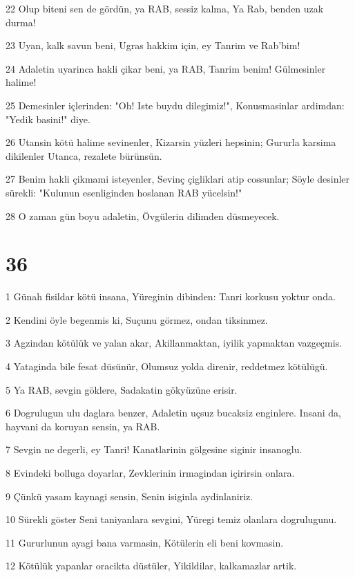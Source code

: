 \par 22 Olup biteni sen de gördün, ya RAB, sessiz kalma, Ya Rab, benden uzak durma!
\par 23 Uyan, kalk savun beni, Ugras hakkim için, ey Tanrim ve Rab'bim!
\par 24 Adaletin uyarinca hakli çikar beni, ya RAB, Tanrim benim! Gülmesinler halime!
\par 25 Demesinler içlerinden: "Oh! Iste buydu dilegimiz!", Konusmasinlar ardimdan: "Yedik basini!" diye.
\par 26 Utansin kötü halime sevinenler, Kizarsin yüzleri hepsinin; Gururla karsima dikilenler Utanca, rezalete bürünsün.
\par 27 Benim hakli çikmami isteyenler, Sevinç çigliklari atip cossunlar; Söyle desinler sürekli: "Kulunun esenliginden hoslanan RAB yücelsin!"
\par 28 O zaman gün boyu adaletin, Övgülerin dilimden düsmeyecek.

\chapter{36}

\par 1 Günah fisildar kötü insana, Yüreginin dibinden: Tanri korkusu yoktur onda.
\par 2 Kendini öyle begenmis ki, Suçunu görmez, ondan tiksinmez.
\par 3 Agzindan kötülük ve yalan akar, Akillanmaktan, iyilik yapmaktan vazgeçmis.
\par 4 Yataginda bile fesat düsünür, Olumsuz yolda direnir, reddetmez kötülügü.
\par 5 Ya RAB, sevgin göklere, Sadakatin gökyüzüne erisir.
\par 6 Dogrulugun ulu daglara benzer, Adaletin uçsuz bucaksiz enginlere. Insani da, hayvani da koruyan sensin, ya RAB.
\par 7 Sevgin ne degerli, ey Tanri! Kanatlarinin gölgesine siginir insanoglu.
\par 8 Evindeki bolluga doyarlar, Zevklerinin irmagindan içirirsin onlara.
\par 9 Çünkü yasam kaynagi sensin, Senin isiginla aydinlaniriz.
\par 10 Sürekli göster Seni taniyanlara sevgini, Yüregi temiz olanlara dogrulugunu.
\par 11 Gururlunun ayagi bana varmasin, Kötülerin eli beni kovmasin.
\par 12 Kötülük yapanlar oracikta düstüler, Yikildilar, kalkamazlar artik.

